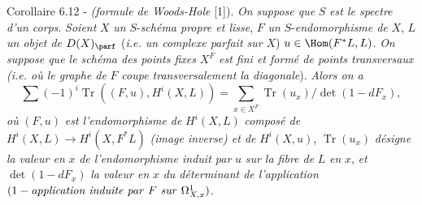 \begin{statement}{Corollaire 6.12 -}
\emph{(formule de Woods-Hole} [1]). \emph{On suppose que} $S$ \emph{est le spectre d'un corps}. \emph{Soient} $X$ \emph{un} $S$-\emph{schéma propre et lisse}, $F$ \emph{un} $S$-\emph{endomorphisme de} $X$, $L$ \emph{un objet de} $D(X)_{\parf}$ (\emph{i.e. un complexe parfait sur} $X$) $u\in\Hom(F^*L,L)$. \emph{On suppose que le schéma des points fixes} $X^F$ \emph{est fini et formé de points transversaux (i.e. où le graphe de} $F$ \emph{coupe transversalement la diagonale}). \emph{Alors on a}
\[
\sum(-1)^i\operatorname{Tr}((F,u),H^i(X,L))=
\sum_{x\in X^F}\operatorname{Tr}(u_x)/\det(1-dF_x),
\]
\emph{où} $(F,u)$ \emph{est l'endomorphisme de} $H^i(X,L)$ \emph{composé de} $H^i(X,L)\to H^i(X,F^*L)$ 
\emph{(image inverse) et de} $H^i(X,u)$, $\operatorname{Tr}(u_x)$ \emph{désigne la}
\emph{valeur en} $x$ \emph{de l'endomorphisme induit par} $u$ \emph{sur la fibre de} $L$ \emph{en} $x$, \emph{et} $\det(1-dF_x)$ \emph{la valeur en} $x$ \emph{du déterminant de l'application} $(1-\text{\emph{application induite par} }F\text{ \emph{sur} }\Omega^1_{X,x})$.


\end{statement}
